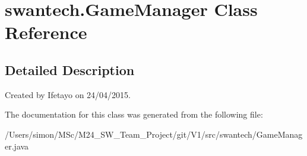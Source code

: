\hypertarget{classswantech_1_1_game_manager}{}\section{swantech.\+Game\+Manager Class Reference}
\label{classswantech_1_1_game_manager}


\subsection{Detailed Description}
Created by Ifetayo on 24/04/2015. 

The documentation for this class was generated from the following file\+:\begin{DoxyCompactItemize}
\item 
/\+Users/simon/\+M\+Sc/\+M24\+\_\+\+S\+W\+\_\+\+Team\+\_\+\+Project/git/\+V1/src/swantech/Game\+Manager.\+java\end{DoxyCompactItemize}
